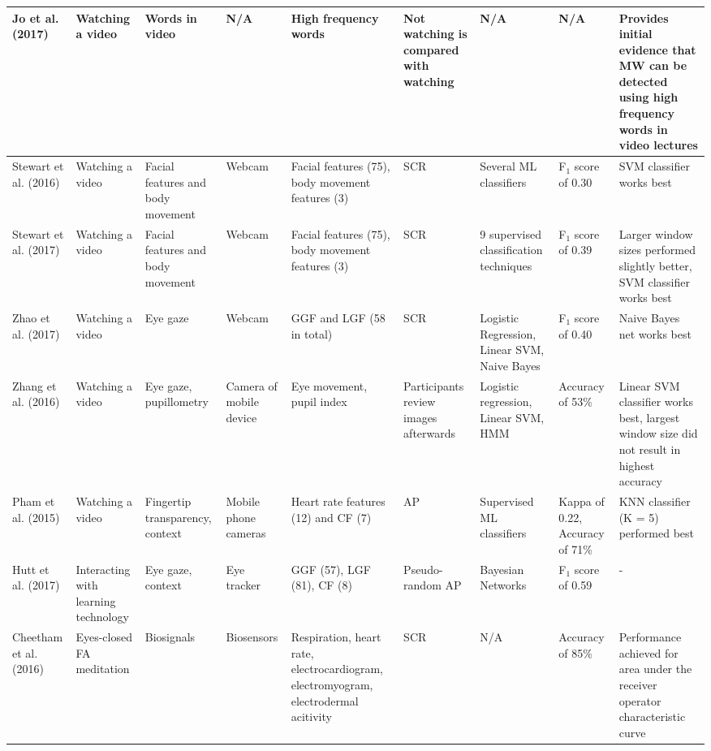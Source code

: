 \begin{ThreePartTable}
\begin{xtabular}{P{20mm}P{24mm}P{22mm}P{24mm}P{28mm}P{21mm}P{26mm}P{24mm}P{42mm}}
                Jo et al. (2017) \cite{Jo2017AMind} & Watching a video & Words in video & N/A & High frequency words & Not watching is compared with watching & N/A & N/A & Provides initial evidence that MW can be detected using high frequency words in video lectures\\ \midrule
                Stewart et al. (2016) \cite{Stewart2016WheresViewing} & Watching a video & Facial features and body movement & Webcam & Facial features (75), body movement features (3) & SCR & Several ML classifiers & F$_1$ score of 0.30 & SVM classifier works best\\ \midrule
                Stewart et al. (2017) \cite{Stewart2017FaceComprehension} & Watching a video & Facial features and body movement & Webcam & Facial features (75), body movement features (3) & SCR & 9 supervised classification techniques & F$_1$ score of 0.39 & Larger window sizes performed slightly better, SVM classifier works best\\ \midrule
                Zhao et al. (2017) \cite{Zhao2017ScalableApproach} & Watching a video & Eye gaze & Webcam & GGF and LGF (58 in total) & SCR & Logistic Regression, Linear SVM, Naive Bayes & F$_1$ score of 0.40 & Naive Bayes net works best\\ \midrule
                Zhang et al. (2016) \cite{ISI:000443429900018} & Watching a video & Eye gaze, pupillometry & Camera of mobile device & Eye movement, pupil index & Participants review images afterwards & Logistic regression, Linear SVM, HMM & Accuracy of 53\% & Linear SVM classifier works best, largest window size did not result in highest accuracy\\ \midrule
                Pham et al. (2015) \cite{Pham2015Attentivelearner:Tracking} & Watching a video & Fingertip transparency, context & Mobile phone cameras & Heart rate features (12) and CF (7) & AP & Supervised ML classifiers & Kappa of 0.22, Accuracy of 71\% & KNN classifier (K = 5) performed best\\ \midrule
                Hutt et al. (2017) \cite{Hutt2017OutClassroom} & Interacting with learning technology & Eye gaze, context & Eye tracker & GGF (57), LGF (81), CF (8) & Pseudo-random AP & Bayesian Networks & F$_1$ score of 0.59 & -\\ \midrule
                Cheetham et al. (2016) \cite{Cheetham2016AutomatedApplication} & Eyes-closed FA meditation & Biosignals & Biosensors & Respiration, heart rate, electrocardiogram, electromyogram, electrodermal acitivity & SCR & N/A & Accuracy of 85\% & Performance achieved for area under the receiver operator characteristic curve\\ \midrule

\end{xtabular}
\end{ThreePartTable}
